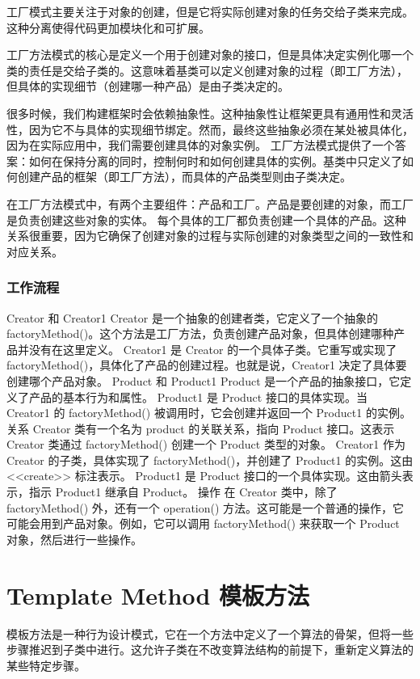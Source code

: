 工厂模式主要关注于对象的创建，但是它将实际创建对象的任务交给子类来完成。这种分离使得代码更加模块化和可扩展。

工厂方法模式的核心是定义一个用于创建对象的接口，但是具体决定实例化哪一个类的责任是交给子类的。这意味着基类可以定义创建对象的过程（即工厂方法），但具体的实现细节（创建哪一种产品）是由子类决定的。

很多时候，我们构建框架时会依赖抽象性。这种抽象性让框架更具有通用性和灵活性，因为它不与具体的实现细节绑定。然而，最终这些抽象必须在某处被具体化，因为在实际应用中，我们需要创建具体的对象实例。
工厂方法模式提供了一个答案：如何在保持分离的同时，控制何时和如何创建具体的实例。基类中只定义了如何创建产品的框架（即工厂方法），而具体的产品类型则由子类决定。

在工厂方法模式中，有两个主要组件：产品和工厂。产品是要创建的对象，而工厂是负责创建这些对象的实体。
每个具体的工厂都负责创建一个具体的产品。这种关系很重要，因为它确保了创建对象的过程与实际创建的对象类型之间的一致性和对应关系。

\subsubsection{工作流程}
Creator 和 Creator1
Creator 是一个抽象的创建者类，它定义了一个抽象的 factoryMethod()。这个方法是工厂方法，负责创建产品对象，但具体创建哪种产品并没有在这里定义。
Creator1 是 Creator 的一个具体子类。它重写或实现了 factoryMethod()，具体化了产品的创建过程。也就是说，Creator1 决定了具体要创建哪个产品对象。
Product 和 Product1
Product 是一个产品的抽象接口，它定义了产品的基本行为和属性。
Product1 是 Product 接口的具体实现。当 Creator1 的 factoryMethod() 被调用时，它会创建并返回一个 Product1 的实例。
关系
Creator 类有一个名为 product 的关联关系，指向 Product 接口。这表示 Creator 类通过 factoryMethod() 创建一个 Product 类型的对象。
Creator1 作为 Creator 的子类，具体实现了 factoryMethod()，并创建了 Product1 的实例。这由 <<create>> 标注表示。
Product1 是 Product 接口的一个具体实现。这由箭头表示，指示 Product1 继承自 Product。
操作
在 Creator 类中，除了 factoryMethod() 外，还有一个 operation() 方法。这可能是一个普通的操作，它可能会用到产品对象。例如，它可以调用 factoryMethod() 来获取一个 Product 对象，然后进行一些操作。

\section{Template Method 模板方法}

模板方法是一种行为设计模式，它在一个方法中定义了一个算法的骨架，但将一些步骤推迟到子类中进行。这允许子类在不改变算法结构的前提下，重新定义算法的某些特定步骤。

